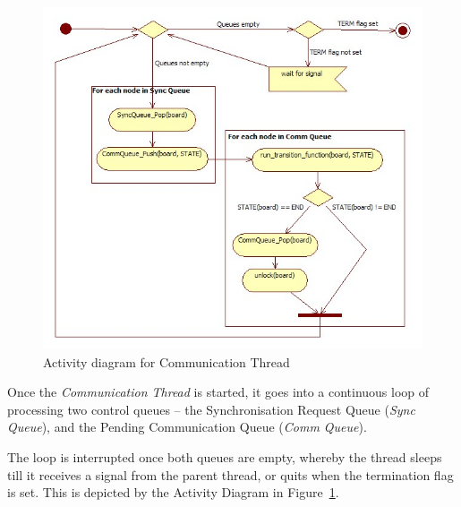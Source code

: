 \begin{figure}[h]
 \centering
  \includegraphics[scale=0.50]{commloop.jpg}
 \caption{Activity diagram for Communication Thread}
 \label{fig:commloop}
\end{figure}

Once the \textit{Communication Thread} is started, it goes into a continuous loop of processing two control queues -- the Synchronisation Request Queue (\textit{Sync Queue}), and the Pending Communication Queue (\textit{Comm Queue}). 

The loop is interrupted once both queues are empty, whereby the thread sleeps till it receives a signal from the parent thread, or quits when the termination flag is set. This is depicted by the Activity Diagram in Figure~\ref{fig:commloop}.



